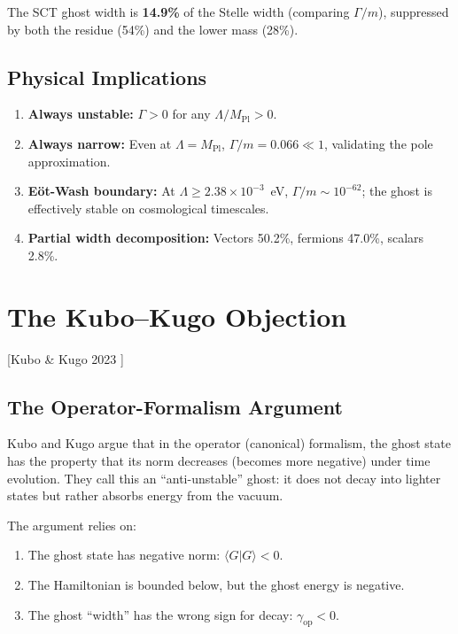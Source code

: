 \documentclass[11pt,a4paper]{article}
\theoremstyle{plain}
\theoremstyle{definition}
\theoremstyle{remark}
\newcommand{\MPl}{M_{\mathrm{Pl}}}
\newcommand{\fromlit}[1]{\textcolor{blue!70!black}{\textsf{[#1]}}}
\begin{document}
The SCT ghost width is \textbf{14.9\%} of the Stelle width (comparing
$\Gamma/m$), suppressed by both the residue (54\%) and the lower mass
(28\%).

\subsection{Physical Implications}

\begin{enumerate}[nosep]
  \item \textbf{Always unstable:} $\Gamma > 0$ for any
    $\Lambda/\MPl > 0$.
  \item \textbf{Always narrow:} Even at $\Lambda = \MPl$,
    $\Gamma/m = 0.066 \ll 1$, validating the pole approximation.
  \item \textbf{Eöt-Wash boundary:} At $\Lambda \geq 2.38 \times
    10^{-3}$~eV, $\Gamma/m \sim 10^{-62}$; the ghost is effectively
    stable on cosmological timescales.
  \item \textbf{Partial width decomposition:} Vectors 50.2\%, fermions
    47.0\%, scalars 2.8\%.
\end{enumerate}


\section{The Kubo--Kugo Objection}
\label{sec:kubo-kugo}

\fromlit{Kubo \& Kugo 2023 \cite{KuboKugo2023}}

\subsection{The Operator-Formalism Argument}

Kubo and Kugo argue that in the operator (canonical) formalism, the
ghost state has the property that its norm decreases (becomes more
negative) under time evolution.  They call this an ``anti-unstable''
ghost: it does not decay into lighter states but rather absorbs energy
from the vacuum.

The argument relies on:
\begin{enumerate}[nosep]
  \item The ghost state has negative norm: $\langle G | G \rangle < 0$.
  \item The Hamiltonian is bounded below, but the ghost energy is
    negative.
  \item The ghost ``width'' has the wrong sign for decay:
    $\gamma_{\mathrm{op}} < 0$.
\end{enumerate}
\end{document}
